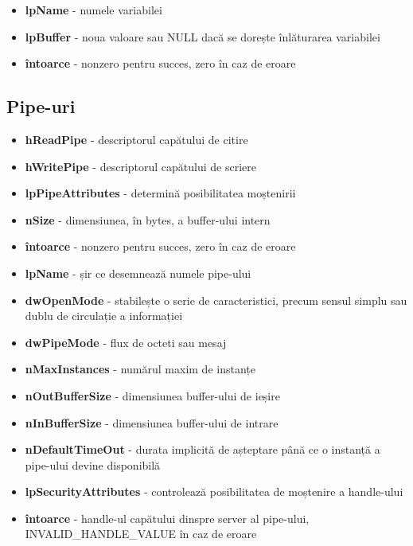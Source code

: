 \documentclass{refcard.cs.pub.ro}
\begin{document}
\begin{multicols*}{3}
\vspace*{1cm}

\begin{itemize}
\item \textbf{lpName} - numele variabilei
\item \textbf{lpBuffer} - noua valoare sau NULL dacă se dorește înlăturarea variabilei
\item \textbf{întoarce} - nonzero pentru succes, zero în caz de eroare
\end{itemize}

\subsection{Pipe-uri}

\begin{itemize}
\item \textbf{hReadPipe} - descriptorul capătului de citire
\item \textbf{hWritePipe} - descriptorul capătului de scriere
\item \textbf{lpPipeAttributes} - determină posibilitatea moștenirii
\item \textbf{nSize} - dimensiunea, în bytes, a buffer-ului intern
\item \textbf{întoarce} - nonzero pentru succes, zero în caz de eroare
\end{itemize}

\begin{itemize}
\item \textbf{lpName} - șir ce desemnează numele pipe-ului
\item \textbf{dwOpenMode} - stabilește o serie de caracteristici, precum sensul simplu sau dublu de circulație a informației
\item \textbf{dwPipeMode} - flux de octeti sau mesaj
\item \textbf{nMaxInstances} - numărul maxim de instanțe
\item \textbf{nOutBufferSize} - dimensiunea buffer-ului de ieșire
\item \textbf{nInBufferSize} - dimensiunea buffer-ului de intrare
\item \textbf{nDefaultTimeOut} - durata implicită de așteptare până ce o instanță a pipe-ului devine disponibilă
\item \textbf{lpSecurityAttributes} - controlează posibilitatea de moștenire a handle-ului
\item \textbf{întoarce} - handle-ul capătului dinspre server al pipe-ului, INVALID_HANDLE_VALUE în caz de eroare
\end{itemize}


\end{multicols*}
\end{document}

